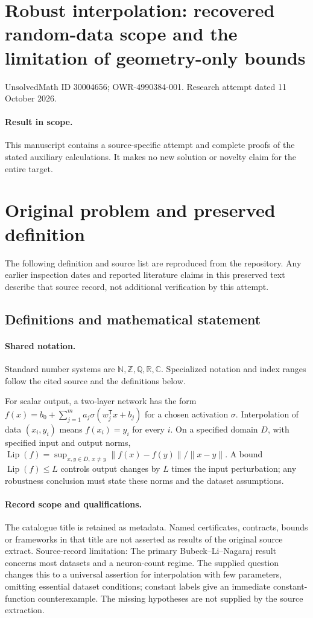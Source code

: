 \documentclass[11pt]{article}
\begin{document}
\section*{Robust interpolation: recovered random-data scope and the limitation of geometry-only bounds}
\noindent UnsolvedMath ID 30004656; OWR-4990384-001. Research attempt dated 11 October 2026.
\paragraph{Result in scope.}This manuscript contains a source-specific attempt and complete proofs of the stated auxiliary calculations. It makes no new solution or novelty claim for the entire target.
\section{Original problem and preserved definition}
The following definition and source list are reproduced from the repository. Any earlier inspection dates and reported literature claims in this preserved text describe that source record, not additional verification by this attempt.
\subsection{Definitions and mathematical statement}

\paragraph{Shared notation.}Standard number systems are $\mathbb N,\mathbb Z,\mathbb Q,\mathbb R,\mathbb C$. Specialized notation and index ranges follow the cited source and the definitions below.


For scalar output, a two-layer network has the form $f(x)=b_0+\sum_{j=1}^m a_j\sigma(w_j^{\mathsf T}x+b_j)$ for a chosen activation $\sigma$. Interpolation of data $(x_i,y_i)$ means $f(x_i)=y_i$ for every $i$. On a specified domain $D$, with specified input and output norms, $\operatorname{Lip}(f)=\sup_{x,y\in D,\,x\ne y}\|f(x)-f(y)\|/\|x-y\|$. A bound $\operatorname{Lip}(f)\le L$ controls output changes by $L$ times the input perturbation; any robustness conclusion must state these norms and the dataset assumptions.
\paragraph{Record scope and qualifications.}
The catalogue title is retained as metadata. Named certificates, contracts, bounds or frameworks in that title are not asserted as results of the original source extract.
Source-record limitation: The primary Bubeck--Li--Nagaraj result concerns most datasets and a neuron-count regime. The supplied question changes this to a universal assertion for interpolation with few parameters, omitting essential dataset conditions; constant labels give an immediate constant-function counterexample. The missing hypotheses are not supplied by the source extraction.
\end{document}
